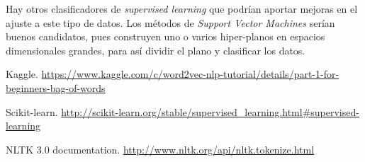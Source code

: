 \documentclass[11pt,a4paper]{article}
\begin{document}
  Hay otros clasificadores de {\em supervised learning} que podr\'ian aportar mejoras en el ajuste a este tipo de datos. Los m\'etodos de {\em Support Vector Machines} ser\'ian buenos candidatos, pues construyen uno o varios hiper-planos en espacios dimensionales grandes, para as\'i dividir el plano y clasificar los datos. 

\begin{thebibliography}{}

\bibitem{} Kaggle.
\newblock \url{https://www.kaggle.com/c/word2vec-nlp-tutorial/details/part-1-for-beginners-bag-of-words}

\bibitem{} Scikit-learn.
\newblock \url{http://scikit-learn.org/stable/supervised_learning.html#supervised-learning}

\bibitem{} NLTK 3.0 documentation.
\newblock \url{http://www.nltk.org/api/nltk.tokenize.html}


\end{thebibliography}
\end{document}
